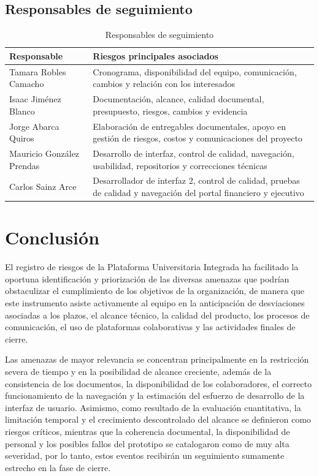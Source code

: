 \documentclass[11pt,spanish]{article}
\begin{document}
\subsection{Responsables de seguimiento}

\begin{table}[H]
\centering
\caption{Responsables de seguimiento}
\label{tab-responsables-seguimiento}
{\small
\begin{tabularx}{\textwidth}{p{4.5cm} Y}
\toprule
\textbf{Responsable} & \textbf{Riesgos principales asociados} \\
\midrule
Tamara Robles Camacho & Cronograma, disponibilidad del equipo, comunicación, cambios y relación con los interesados \\
Isaac Jiménez Blanco & Documentación, alcance, calidad documental, presupuesto, riesgos, cambios y evidencia \\
Jorge Abarca Quiros & Elaboración de entregables documentales, apoyo en gestión de riesgos, costos y comunicaciones del proyecto \\
Mauricio González Prendas & Desarrollo de interfaz, control de calidad, navegación, usabilidad, repositorios y correcciones técnicas \\
Carlos Sainz Arce & Desarrollador de interfaz 2, control de calidad, pruebas de calidad y navegación del portal financiero y ejecutivo \\
\bottomrule
\end{tabularx}
}
\end{table}

\section{Conclusión}

El registro de riesgos de la Plataforma Universitaria Integrada ha facilitado la oportuna identificación y priorización de las diversas amenazas que podrían obstaculizar el cumplimiento de los objetivos de la organización, de manera que este instrumento asiste activamente al equipo en la anticipación de desviaciones asociadas a los plazos, el alcance técnico, la calidad del producto, los procesos de comunicación, el uso de plataformas colaborativas y las actividades finales de cierre.

Las amenazas de mayor relevancia se concentran principalmente en la restricción severa de tiempo y en la posibilidad de alcance creciente, además de la consistencia de los documentos, la disponibilidad de los colaboradores, el correcto funcionamiento de la navegación y la estimación del esfuerzo de desarrollo de la interfaz de usuario. Asimismo, como resultado de la evaluación cuantitativa, la limitación temporal y el crecimiento descontrolado del alcance se definieron como riesgos críticos, mientras que la coherencia documental, la disponibilidad de personal y los posibles fallos del prototipo se catalogaron como de muy alta severidad, por lo tanto, estos eventos recibirán un seguimiento sumamente estrecho en la fase de cierre.
\end{document}
